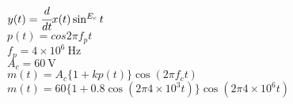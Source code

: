 \documentclass[uplatex,a4j,11pt]{jsarticle}
\begin{document}
\title{}
\author{}
\date{\today}
\maketitle

$y(t)=\cfrac{d}{dt}x(t)\sin^{E_c}t$\\
$p(t)=cos2{\pi}f_pt$\\
$f_p=4\times10^6\ \si{\hertz}$\\
$A_c=60\ \si{\volt}$\\
$m(t)=A_c\{1+kp(t)\}\cos(2{\pi}f_c t)$\\
$m(t)=60\{1+0.8\cos(2{\pi}4\times10^3t)\}\cos(2{\pi}4\times10^6t)$
\end{document}
